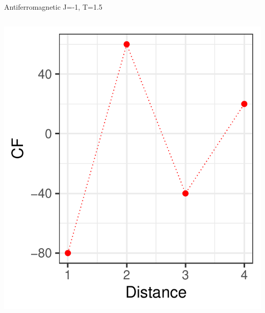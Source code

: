 \documentclass{beamer}
\begin{document}
\begin{frame}{Antiferromagnetic J=-1, T=1.5}
\begin{columns}
\begin{column}{0.5\textwidth}
\begin{center}
     \includegraphics[width=\textwidth]{Pic/J-1_60_2500_T=1.5_CORRELATION.pdf}
     \end{center}
\end{column}
\end{columns}
\end{frame}
\end{document}
